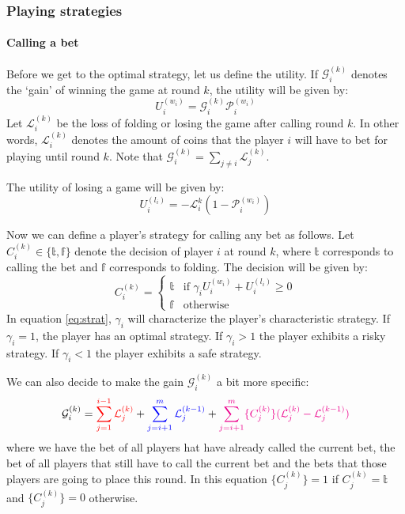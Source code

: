 \documentclass[a4paper,10pt]{article}
\begin{document}
\subsubsection{Playing strategies}
\paragraph{Calling a bet}
Before we get to the optimal strategy, let us define the utility. If $\mathcal G^{(k)}_i$ denotes the `gain' of winning the game at round $k$, the utility will be given by:
\begin{equation}
 U^{(w_i)}_i = \mathcal G^{(k)}_i \mathcal P^{(w_i)}_i
\label{eq:util}
 \end{equation}
Let $\mathcal{L}^{(k)}_i$ be the loss of folding or losing the game after calling round $k$. In other words, $\mathcal L^{(k)}_i$ denotes the amount of coins that the player $i$ will have to bet for playing until round $k$. Note that $\displaystyle \mathcal G^{(k)}_i = \sum_{j\neq i} \mathcal L^{(k)}_j$. 

The utility of losing a game will be given by:
\begin{equation}
 U^{(l_i)}_i = -\mathcal L^{k}_i (1-\mathcal P^{(w_i)}_i)
 \label{eq:loss}
\end{equation}

Now we can define a player's strategy for calling any bet as follows. Let $C_i^{(k)} \in \{\mathbb t, \mathbb f\}$ denote the decision of player $i$ at round $k$, where $\mathbb t$ corresponds to calling the bet and $\mathbb f$ corresponds to folding. The decision will be given by:
\begin{equation}
C_i^{(k)}  =
\begin{cases}
 \mathbb t & \text{if } \gamma_i U^{(w_i)}_i + U^{(l_i)}_i \geq 0\\
 \mathbb f & \text{otherwise}
\end{cases}
\label{eq:strat}
\end{equation}
In equation \ref{eq:strat}, $\gamma_i$ will characterize the player's characteristic strategy. If $\gamma_i = 1$, the player has an optimal strategy. If $\gamma_i > 1$ the player exhibits a risky strategy. If $\gamma_i < 1$ the player exhibits a safe strategy.

We can also decide to make the gain $\mathcal G^{(k)}_i$ a bit more specific:
\begin{equation}
\mathcal G^{(k)}_i = {\color{red} \sum_{j=1}^{i-1} \mathcal L^{(k)}_j} + {\color{blue} \sum_{j=i+1}^m \mathcal L^{(k-1)}_j} + {\color{magenta} \sum_{j=i+1}^m \{ C^{(k)}_j\} (\mathcal L^{(k)}_j - \mathcal L^{(k-1)}_j)}
\label{eq:gain}
\end{equation}
where we have the {\color{red} bet of all players hat have already called the current bet}, the {\color{blue} bet of all players that still have to call the current bet} and {\color{magenta} the bets that those players are going to place this round}. In this equation $\{C^{(k)}_j\} = 1$ if $C^{(k)}_j=\mathbb{t}$ and $\{C^{(k)}_j\} = 0$ otherwise.
\end{document}
